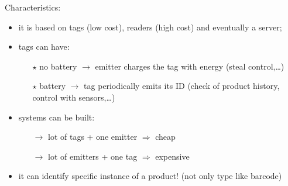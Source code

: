 Characteristics:
\begin{itemize}
    \item it is based on tags (low cost), readers (high cost) and eventually
    a server;
    \item tags can have:
    \begin{itemize}
        \item[$\star$] no battery $\rightarrow$ emitter charges the tag with energy (steal control,\dots)
        \item[$\star$] battery $\rightarrow$ tag periodically emits its ID (check of product history, control with sensors,\dots)
    \end{itemize}
    \item systems can be built:
    \begin{itemize}
        \item[$\rightarrow$] lot of tags + one emitter $\Rightarrow$ cheap
        \item[$\rightarrow$] lot of emitters + one tag $\Rightarrow$ expensive
    \end{itemize}
    \item it can identify specific instance of a product! (not only type like barcode)
\end{itemize}